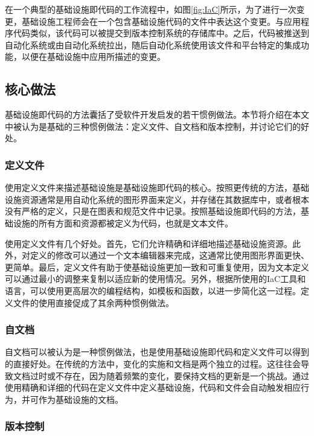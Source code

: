 \documentclass[macfonts,master]{njuthesis}
\begin{document}
在一个典型的基础设施即代码的工作流程中，如图\ref{fig:IaC}所示，为了进行一次变更，基础设施工程师会在一个包含基础设施代码的文件中表达这个变更。与应用程序代码类似，该代码可以被提交到版本控制系统的存储库中。之后，代码被推送到自动化系统或由自动化系统拉出，随后自动化系统使用该文件和平台特定的集成功能，以便在基础设施中应用所描述的变更\cite{whatisiac}。

\subsection{核心做法}

基础设施即代码的方法囊括了受软件开发启发的若干惯例做法。本节将介绍在本文中被认为是基础的三种惯例做法：定义文件、自文档和版本控制，并讨论它们的好处。

\subsubsection{定义文件}

使用定义文件来描述基础设施是基础设施即代码的核心。按照更传统的方法，基础设施资源通常是用自动化系统的图形界面来定义，并存储在其数据库中，或者根本没有严格的定义，只是在图表和规范文件中记录。按照基础设施即代码的方法，基础设施的所有方面和资源都被定义为代码，也就是文本文件\cite{morris2016infrastructure}。

使用定义文件有几个好处。首先，它们允许精确和详细地描述基础设施资源。此外，对定义的修改可以通过一个文本编辑器来完成，这通常比使用图形界面更快、更简单。最后，定义文件有助于使基础设施更加一致和可重复使用，因为文本定义可以通过最小的调整来复制以适应新的使用情况。另外，根据所使用的IaC工具和语言，可以使用更高层次的编程结构，如模板和函数，以进一步简化这一过程\cite{morris2016infrastructure}\cite{whatisiac}。定义文件的使用直接促成了其余两种惯例做法。

\subsubsection{自文档}

自文档可以被认为是一种惯例做法，也是使用基础设施即代码和定义文件可以得到的直接好处。在传统的方法中，变化的实施和文档是两个独立的过程。这往往会导致文档过时或不存在，因为随着频繁的变化，要保持文档的更新是一个挑战。通过使用精确和详细的代码在定义文件中定义基础设施，代码和文件会自动触发相应行为，并可作为基础设施的文档\cite{morris2016infrastructure}\cite{whatisiac}。

\subsubsection{版本控制}
\end{document}
